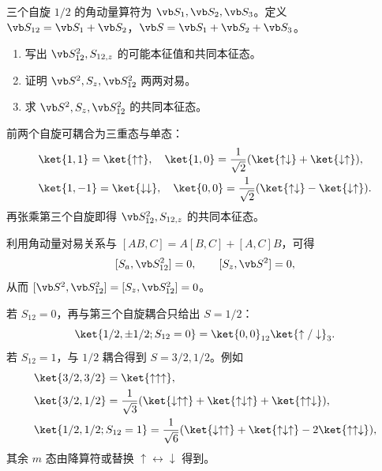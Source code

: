 \begin{question}
三个自旋 $1/2$ 的角动量算符为 $\vb S_1,\vb S_2,\vb S_3$。定义 $\vb S_{12}=\vb S_1+\vb S_2$，$\vb S=\vb S_1+\vb S_2+\vb S_3$。
\begin{enumerate}
  \item 写出 $\vb S_{12}^2,S_{12,z}$ 的可能本征值和共同本征态。
  \item 证明 $\vb S^2,S_z,\vb S_{12}^2$ 两两对易。
  \item 求 $\vb S^2,S_z,\vb S_{12}^2$ 的共同本征态。
\end{enumerate}
\begin{solution}
前两个自旋可耦合为三重态与单态：
\[
\begin{aligned}
  &\ket{1,1}=\ket{\uparrow\uparrow},\quad
  \ket{1,0}={1\over\sqrt2}(\ket{\uparrow\downarrow}+\ket{\downarrow\uparrow}),\\
  &\ket{1,-1}=\ket{\downarrow\downarrow},\quad
  \ket{0,0}={1\over\sqrt2}(\ket{\uparrow\downarrow}-\ket{\downarrow\uparrow}).
\end{aligned}
\]
再张乘第三个自旋即得 $\vb S_{12}^2,S_{12,z}$ 的共同本征态。

利用角动量对易关系与 $[AB,C]=A[B,C]+[A,C]B$，可得
\[
  [S_a,\vb S_{12}^2]=0,\qquad [S_z,\vb S^2]=0,
\]
从而 $[\vb S^2,\vb S_{12}^2]=[S_z,\vb S_{12}^2]=0$。

若 $S_{12}=0$，再与第三个自旋耦合只给出 $S=1/2$：
\[
  \ket{1/2,\pm1/2;S_{12}=0}=\ket{0,0}_{12}\ket{\uparrow/\downarrow}_3 .
\]
若 $S_{12}=1$，与 $1/2$ 耦合得到 $S=3/2,1/2$。例如
\[
\begin{aligned}
  &\ket{3/2,3/2}=\ket{\uparrow\uparrow\uparrow},\\
  &\ket{3/2,1/2}={1\over\sqrt3}(\ket{\downarrow\uparrow\uparrow}+\ket{\uparrow\downarrow\uparrow}+\ket{\uparrow\uparrow\downarrow}),\\
  &\ket{1/2,1/2;S_{12}=1}={1\over\sqrt6}(\ket{\downarrow\uparrow\uparrow}+\ket{\uparrow\downarrow\uparrow}-2\ket{\uparrow\uparrow\downarrow}),
\end{aligned}
\]
其余 $m$ 态由降算符或替换 $\uparrow\leftrightarrow\downarrow$ 得到。
\end{solution}
\end{question}

